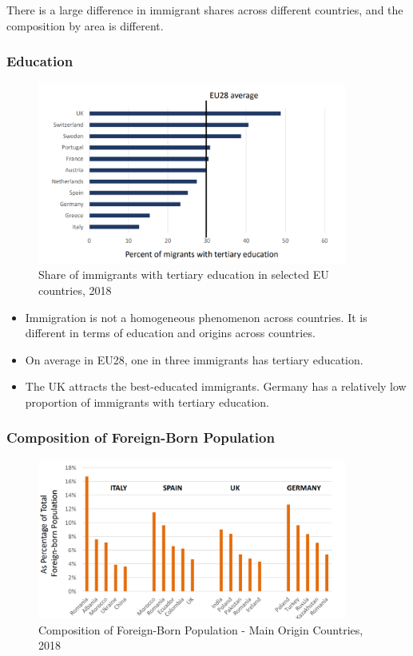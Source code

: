             There is a large difference in immigrant shares across different countries, and the composition by area is different.

        \subsubsection{Education}

            \begin{figure}[H]
                \centering
                \includegraphics[width=4in]{images/ch11/4.png}
                \caption{Share of immigrants with tertiary education in selected EU countries, 2018}
            \end{figure}
            
            \begin{itemize}
                \item Immigration is not a homogeneous phenomenon across countries. It is different in terms of education and origins across countries. 
                \item On average in EU28, one in three immigrants has tertiary education.
                \item The UK attracts the best-educated immigrants. Germany has a relatively low proportion of immigrants with tertiary education.
            \end{itemize}

        \subsubsection{Composition of Foreign-Born Population}

            \begin{figure}[H]
                \centering
                \includegraphics[width=4in]{images/ch11/5.png}
                \caption{Composition of Foreign-Born Population - Main Origin Countries, 2018}
            \end{figure}

